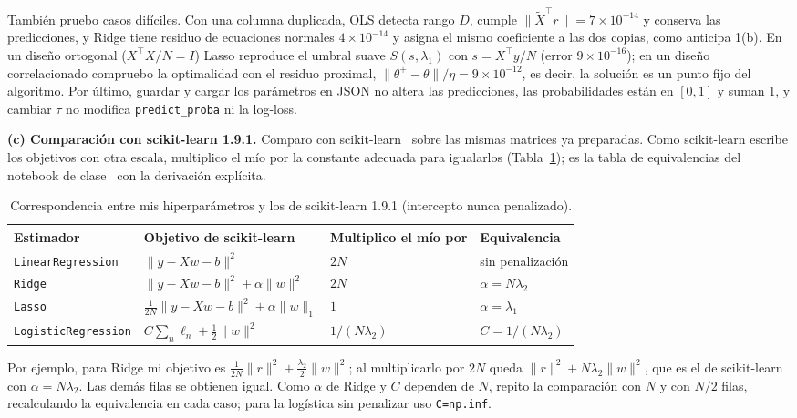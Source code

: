 \documentclass[10pt,a4paper]{article}
\newcommand{\Xt}{\tilde X}
\begin{document}
También pruebo casos difíciles. Con una columna duplicada, OLS detecta rango $D$, cumple $\lVert\Xt^\top r\rVert=7\times10^{-14}$ y conserva las predicciones, y Ridge tiene residuo de ecuaciones normales $4\times10^{-14}$ y asigna el mismo coeficiente a las dos copias, como anticipa 1(b). En un diseño ortogonal ($X^\top X/N=I$) Lasso reproduce el umbral suave $S(s,\lambda_1)$ con $s=X^\top y/N$ (error $9\times10^{-16}$); en un diseño correlacionado compruebo la optimalidad con el residuo proximal, $\lVert\theta^+-\theta\rVert/\eta=9\times10^{-12}$, es decir, la solución es un punto fijo del algoritmo. Por último, guardar y cargar los parámetros en JSON no altera las predicciones, las probabilidades están en $[0,1]$ y suman 1, y cambiar $\tau$ no modifica \texttt{predict\_proba} ni la log-loss.

\textbf{(c) Comparación con scikit-learn 1.9.1.}
Comparo con scikit-learn~\cite{sklearn} sobre las mismas matrices ya preparadas. Como scikit-learn escribe los objetivos con otra escala, multiplico el mío por la constante adecuada para igualarlos (Tabla~\ref{tab:equiv}); es la tabla de equivalencias del notebook de clase~\cite{nbreg} con la derivación explícita.

\begin{table}[h]\centering\small
\caption{Correspondencia entre mis hiperparámetros y los de scikit-learn 1.9.1 (intercepto nunca penalizado).}\label{tab:equiv}
\begin{tabular}{llll}\toprule
Estimador & Objetivo de scikit-learn & Multiplico el mío por & Equivalencia\\\midrule
\texttt{LinearRegression} & $\lVert y-Xw-b\rVert^2$ & $2N$ & sin penalización\\
\texttt{Ridge} & $\lVert y-Xw-b\rVert^2+\alpha\lVert w\rVert^2$ & $2N$ & $\alpha=N\lambda_2$\\
\texttt{Lasso} & $\frac1{2N}\lVert y-Xw-b\rVert^2+\alpha\lVert w\rVert_1$ & $1$ & $\alpha=\lambda_1$\\
\texttt{LogisticRegression} & $C\sum_n\ell_n+\frac12\lVert w\rVert^2$ & $1/(N\lambda_2)$ & $C=1/(N\lambda_2)$\\\bottomrule
\end{tabular}\end{table}

Por ejemplo, para Ridge mi objetivo es $\frac1{2N}\lVert r\rVert^2+\frac{\lambda_2}{2}\lVert w\rVert^2$; al multiplicarlo por $2N$ queda $\lVert r\rVert^2+N\lambda_2\lVert w\rVert^2$, que es el de scikit-learn con $\alpha=N\lambda_2$. Las demás filas se obtienen igual. Como $\alpha$ de Ridge y $C$ dependen de $N$, repito la comparación con $N$ y con $N/2$ filas, recalculando la equivalencia en cada caso; para la logística sin penalizar uso \texttt{C=np.inf}.
\end{document}
